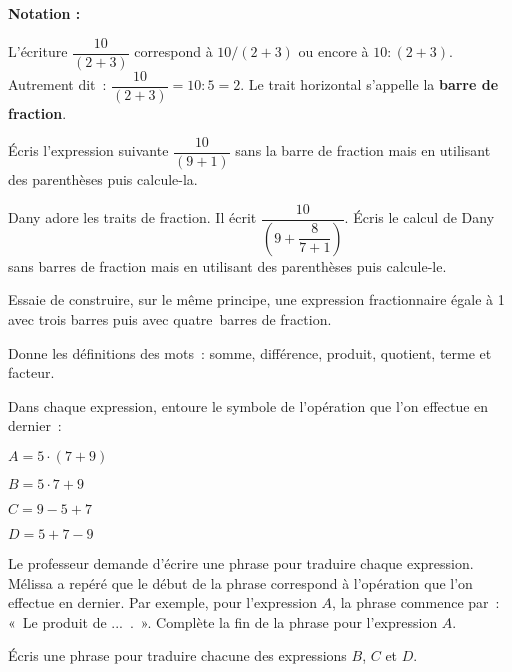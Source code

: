 \begin{activite}

\textbf{Notation :}

L’écriture $\dfrac{10}{(2 + 3)}$ correspond à $10 / (2 + 3)$ ou encore à $10 : (2 + 3)$.
Autrement dit : $\dfrac{10}{(2 + 3)} = 10 : 5 = 2$. Le trait horizontal s'appelle la \textbf{barre de fraction}.

\begin{partie}
Écris l'expression suivante $\dfrac{10}{(9 + 1)}$ sans la barre de fraction mais en utilisant des parenthèses puis calcule-la.
\end{partie}


\begin{partie}
Dany adore les traits de fraction. Il écrit $\dfrac{10}{(9 + \dfrac{8}{7+1})}$. Écris le calcul de Dany sans barres de fraction mais en utilisant des parenthèses puis calcule-le.
\end{partie}


\begin{partie}
Essaie de construire, sur le même principe, une expression fractionnaire égale à 1 avec trois barres puis avec quatre barres de fraction.
\end{partie}

\end{activite}



\begin{activite}

\begin{partie}
Donne les définitions des mots : somme, différence, produit, quotient, terme et facteur.
\end{partie}

\begin{partie}
Dans chaque expression, entoure le symbole de l'opération que l'on effectue en dernier :
\begin{colitemize}{4}
 \item $A = 5 \cdot (7 + 9)$
 \item $B = 5 \cdot 7 + 9$
 \item $C = 9 - 5 + 7$
 \item $D = 5 + 7 - 9$
 \end{colitemize}
\end{partie}

\begin{partie}
Le professeur demande d'écrire une phrase pour traduire chaque expression. Mélissa a repéré que le début de la phrase correspond à l'opération que l'on effectue en dernier. Par exemple, pour l'expression $A$, la phrase commence par : « Le produit de ... . ». Complète la fin de la phrase pour l'expression $A$.
\end{partie}

\begin{partie}
Écris une phrase pour traduire chacune des expressions $B$, $C$ et $D$.
\end{partie}

\end{activite}
